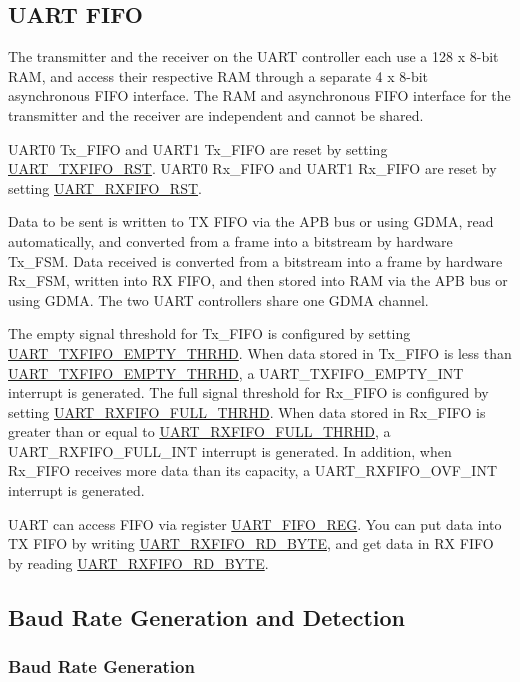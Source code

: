 \documentclass[main\_\_EN.tex]{subfiles}
\begin{document}
\subsection{UART FIFO}

The transmitter and the receiver on the UART controller each use a 128 x 8-bit RAM, and access their respective RAM through a separate 4 x 8-bit asynchronous FIFO interface. The RAM and asynchronous FIFO interface for the transmitter and the receiver are independent and cannot be shared.

UART0 Tx\_FIFO and UART1 Tx\_FIFO are reset by setting \hyperref[fielddesc:UARTTXFIFORST]{UART\_TXFIFO\_RST}. UART0 Rx\_FIFO and UART1 Rx\_FIFO are reset by setting \hyperref[fielddesc:UARTRXFIFORST]{UART\_RXFIFO\_RST}.

Data to be sent is written to TX FIFO via the APB bus or using GDMA, read automatically, and converted from a frame into a bitstream by hardware Tx\_FSM. Data received is converted from a bitstream into a frame by hardware Rx\_FSM, written into RX FIFO, and then stored into RAM via the APB bus or using GDMA. The two UART controllers share one GDMA channel.

The empty signal threshold for Tx\_FIFO is configured by setting \hyperref[fielddesc:UARTTXFIFOEMPTYTHRHD]{UART\_TXFIFO\_EMPTY\_THRHD}. When data stored in Tx\_FIFO is less than \hyperref[fielddesc:UARTTXFIFOEMPTYTHRHD]{UART\_TXFIFO\_EMPTY\_THRHD}, a UART\_TXFIFO\_EMPTY\_INT interrupt is generated. The full signal threshold for Rx\_FIFO is configured by setting \hyperref[fielddesc:UARTRXFIFOFULLTHRHD]{UART\_RXFIFO\_FULL\_THRHD}. When data stored in Rx\_FIFO is greater than or equal to \hyperref[fielddesc:UARTRXFIFOFULLTHRHD]{UART\_RXFIFO\_FULL\_THRHD}, a UART\_RXFIFO\_FULL\_INT interrupt is generated. In addition, when Rx\_FIFO receives more data than its capacity, a UART\_RXFIFO\_OVF\_INT interrupt is generated.

UART can access FIFO via register \hyperref[regdesc:UARTFIFOREG]{UART\_FIFO\_REG}. You can put data into TX FIFO by writing \hyperref[fielddesc:UARTRXFIFORDBYTE]{UART\_RXFIFO\_RD\_BYTE}, and get data in RX FIFO by reading \hyperref[fielddesc:UARTRXFIFORDBYTE]{UART\_RXFIFO\_RD\_BYTE}.

\subsection{Baud Rate Generation and Detection}

\subsubsection{Baud Rate Generation}
\end{document}
